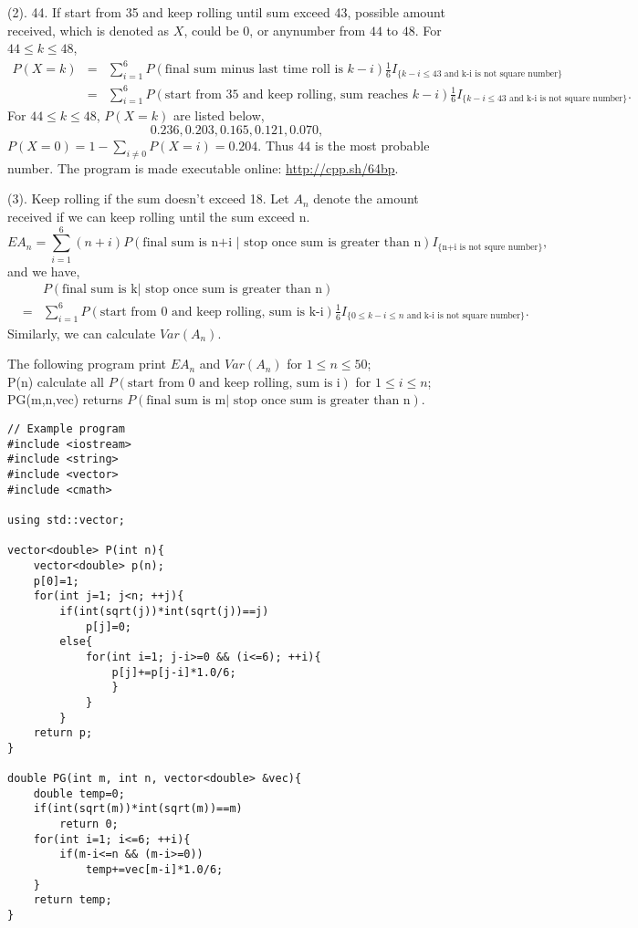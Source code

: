 \documentclass[10pt]{article}
\begin{document}
\begin{enumerate}
(2). 44. If start from 35 and keep rolling until sum exceed 43, possible amount received, which is denoted as $X$, could be $0$, or anynumber from $44$ to $48$. For $44\le k\le48$, 
\begin{eqnarray}
P(X=k)&=&\sum_{i=1}^{6}P(\text{final sum minus last time roll is }k-i)\frac{1}{6}I_{\{k-i\le43\text{ and k-i is not square number\}}} \\
&=&\sum_{i=1}^{6}P(\text{start from 35 and keep rolling, sum reaches }k-i)\frac{1}{6}I_{\{k-i\le43\text{ and k-i is not square number\}}}.
\end{eqnarray}
For $44\le k\le48$, $P(X=k)$ are listed below,
$$0.236, 0.203, 0.165, 0.121, 0.070,$$ $P(X=0)=1-\sum_{i\not=0}P(X=i)=0.204.$ Thus $44$ is the most probable number.
The program is made executable online: \url{http://cpp.sh/64bp}.

(3). Keep rolling if the sum doesn't exceed 18. Let $A_n$ denote the amount received if we can keep rolling until the sum exceed n. 
$$EA_n=\sum_{i=1}^6(n+i)P(\text{final sum is n+i }|\text{ stop once sum is greater than n})I_{\{\text{n+i is not squre number}\}},$$
and we have,
\begin{eqnarray}
&&P(\text{final sum is k}|\text{ stop once sum is greater than n})\\
&=&\sum_{i=1}^6P(\text{start from 0 and keep rolling, sum is k-i})\frac{1}{6}I_{\{0\le k-i\le n\text{ and k-i is not square number}\}}.
\end{eqnarray}
Similarly, we can calculate $Var(A_n)$.

The following program print $EA_n$ and $Var(A_n)$ for $1\le n\le50$; \\
P(n) calculate all $P(\text{start from 0 and keep rolling, sum is i})$ for $1\le i\le n$;\\
PG(m,n,vec) returns $P(\text{final sum is m}|\text{ stop once sum is greater than n})$.
\begin{lstlisting}
// Example program
#include <iostream>
#include <string>
#include <vector>
#include <cmath>

using std::vector;

vector<double> P(int n){
    vector<double> p(n);
    p[0]=1;
    for(int j=1; j<n; ++j){
        if(int(sqrt(j))*int(sqrt(j))==j)
            p[j]=0;
        else{
            for(int i=1; j-i>=0 && (i<=6); ++i){
                p[j]+=p[j-i]*1.0/6;
                }
            }
        }
    return p;
}

double PG(int m, int n, vector<double> &vec){
    double temp=0;
    if(int(sqrt(m))*int(sqrt(m))==m)
        return 0;
    for(int i=1; i<=6; ++i){
        if(m-i<=n && (m-i>=0))
            temp+=vec[m-i]*1.0/6;
    }
    return temp;
}


\end{lstlisting}
\end{enumerate}
\end{document}
